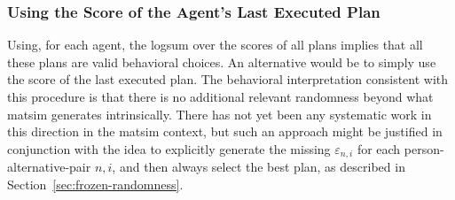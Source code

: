 \subsubsection{Using the Score of the Agent's Last Executed Plan}
\label{ch:economicEval:valuingBehavior:output2Eval:executed}
Using, for each agent, the logsum over the scores of all plans implies that all these plans are valid behavioral choices.  An alternative would be to simply use the score of the last executed plan.  The behavioral interpretation consistent with this procedure is that there is no additional relevant randomness beyond what \acrshort{matsim} generates intrinsically.  There has not yet been any systematic work in this direction in the \acrshort{matsim} context, but such an approach might be justified 
in conjunction 
with the idea to explicitly generate the missing $\varepsilon_{n,i}$ for each person-alternative-pair $n,i$, and then always select the best plan, as described in Section~\ref{sec:frozen-randomness}.



